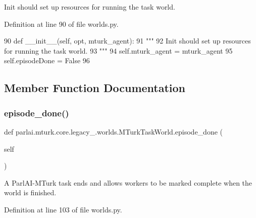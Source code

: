 \begin{DoxyVerb}Init should set up resources for running the task world.
\end{DoxyVerb}
 

Definition at line 90 of file worlds.\+py.


\begin{DoxyCode}
90     \textcolor{keyword}{def }\_\_init\_\_(self, opt, mturk\_agent):
91         \textcolor{stringliteral}{"""}
92 \textcolor{stringliteral}{        Init should set up resources for running the task world.}
93 \textcolor{stringliteral}{        """}
94         self.mturk\_agent = mturk\_agent
95         self.episodeDone = \textcolor{keyword}{False}
96 
\end{DoxyCode}


\subsection{Member Function Documentation}
\mbox{\label{classparlai_1_1mturk_1_1core_1_1legacy__2018_1_1worlds_1_1MTurkTaskWorld_afc2ac424171287eed1cfdf0416fa5fb4}} 
\subsubsection{\texorpdfstring{episode\+\_\+done()}{episode\_done()}}
{\footnotesize\ttfamily def parlai.\+mturk.\+core.\+legacy\+\_.\+worlds.\+M\+Turk\+Task\+World.\+episode\+\_\+done (\begin{DoxyParamCaption}\item[{}]{self }\end{DoxyParamCaption})}

\begin{DoxyVerb}A ParlAI-MTurk task ends and allows workers to be marked complete when the world
is finished.
\end{DoxyVerb}
 

Definition at line 103 of file worlds.\+py.


